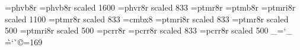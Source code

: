 \font\secbf=phvb8r
\font\titlebf=phvb8r scaled 1600
\font\smallss=phvr8r scaled 833 
\font\tenrm=ptmr8r
\font\tenbf=ptmb8r
\font\tenit=ptmri8r scaled 1100
\font\smallrm=ptmr8r scaled 833
\font\smallbf=cmbx8
\font\smallit=ptmri8r scaled 833
\font\tinyrm=ptmr8r scaled 500
\font\tinyit=ptmri8r scaled 500
\font\tentt=pcrr8r
\font\smalltt=pcrr8r scaled 833
\font\tinytt=pcrr8r scaled 500
\def\LaTeX{L\kern -.36em\lower -.3ex\hbox{A}\kern -.15em\TeX}
\chardef\_=`\_
\chardef\`=`\`
\chardef\copyright=169
\chardef{}
\def\bs{\char92}       %
\def\lbrace{\char123}  %
\def\rbrace{\char125}  %
\def\vertbar{\char124} %
\def\vispace{\char"20} %

